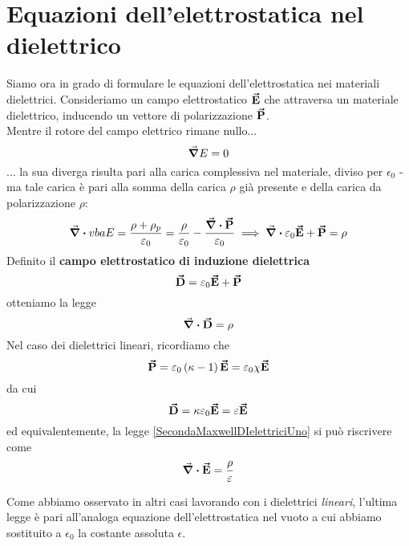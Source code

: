 \section{Equazioni dell'elettrostatica nel dielettrico}
Siamo ora in grado di formulare le equazioni dell'elettrostatica nei materiali dielettrici. Consideriamo un campo elettrostatico $\vb*{\va{E}}$ che attraversa un materiale dielettrico, inducendo un vettore di polarizzazione $\vb*{\va{P}}$.\\
Mentre il rotore del campo elettrico rimane nullo...
\begin{equation}
	\grad{E}=0
\end{equation}
... la sua diverga risulta pari alla carica complessiva nel materiale, diviso per $\epsilon_0$ - ma tale carica è pari alla somma della carica $\rho$ già presente e della carica da polarizzazione $\rho$:
\begin{equation*}
	\div{vba{E}}=\frac{\rho+\rho_p}{\varepsilon_0}=\frac{\rho}{\varepsilon_0}-\frac{\div{\vb*{\va{P}}}}{\varepsilon_0}\implies \div{\varepsilon_0\vb*{\va{E}}+\vb*{\va{P}}}=\rho
\end{equation*}
Definito il \textbf{campo elettrostatico di induzione dielettrica}
\begin{equation}
	\vb*{\va{D}}=\varepsilon_0\vb*{\va{E}}+\vb*{\va{P}}
\end{equation}
otteniamo la legge
\begin{equation}
	\div{\vb*{\va{D}}}=\rho\label{SecondaMaxwellDIelettriciUno}
\end{equation}
Nel caso dei dielettrici lineari, ricordiamo che
\begin{equation*}
	\vb*{\va{P}}=\varepsilon_0\left(\kappa-1\right)\vb*{\va{E}}=\varepsilon_0\chi\vb*{\va{E}}
\end{equation*}
da cui
\begin{equation*}
	\vb*{\va{D}}=\kappa\varepsilon_0\vb*{\va{E}}=\varepsilon\vb*{\va{E}}
\end{equation*}
ed equivalentemente, la legge \eqref{SecondaMaxwellDIelettriciUno} si può riscrivere come
\begin{equation}
	\div{\vb*{\va{E}}}=\frac{\rho}{\varepsilon}
\end{equation} 
\begin{observe}
 Come abbiamo osservato in altri casi lavorando con i dielettrici \textit{lineari}, l'ultima legge è pari all'analoga equazione dell'elettrostatica nel vuoto a cui abbiamo sostituito a $\epsilon_0$ la costante assoluta $\epsilon$.
\end{observe}